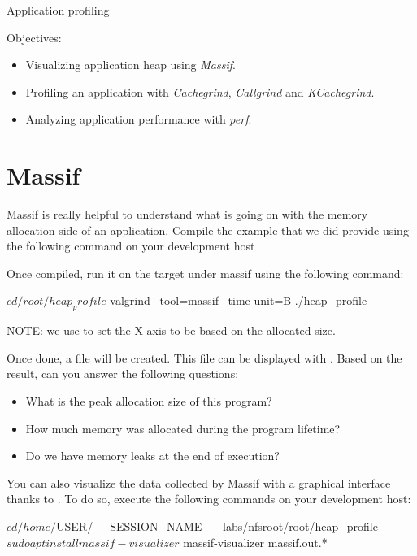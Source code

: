 \subchapter
{Application profiling}
{Objectives:
  \begin{itemize}
    \item Visualizing application heap using {\em Massif}.
    \item Profiling an application with {\em Cachegrind}, {\em Callgrind} and
          {\em KCachegrind}.
    \item Analyzing application performance with {\em perf}.
  \end{itemize}
}

\section{Massif}

Massif is really helpful to understand what is going on with the memory allocation
side of an application. Compile the  example that we did provide
using the following command on your development host


Once compiled, run it on the target under massif using the following command:

\begin{bashinput}
$ cd /root/heap_profile
$ valgrind --tool=massif --time-unit=B ./heap_profile
\end{bashinput}

NOTE: we use  to set the X axis to be based on the allocated
size.

Once done, a  file will be created. This file can be
displayed with . Based on the result, can you answer the
following questions:
\begin{itemize}
  \item What is the peak allocation size of this program?
  \item How much memory was allocated during the program lifetime?
  \item Do we have memory leaks at the end of execution?
\end{itemize}

You can also visualize the data collected by Massif with a graphical
interface thanks to . To do so, execute the
following commands on your development host:

\begin{bashinput}
$ cd /home/$USER/__SESSION_NAME__-labs/nfsroot/root/heap_profile
$ sudo apt install massif-visualizer
$ massif-visualizer massif.out.*
\end{bashinput}

